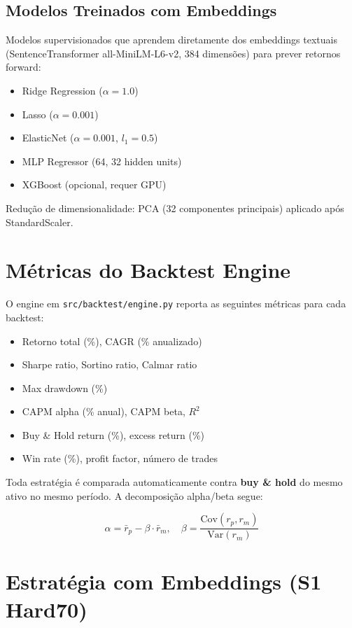 \documentclass[11pt, a4paper]{article}
\begin{document}
\subsection{Modelos Treinados com Embeddings}

Modelos supervisionados que aprendem diretamente dos embeddings textuais (SentenceTransformer all-MiniLM-L6-v2, 384 dimensões) para prever retornos forward:

\begin{itemize}
    \item Ridge Regression ($\alpha = 1.0$)
    \item Lasso ($\alpha = 0.001$)
    \item ElasticNet ($\alpha = 0.001$, $l_1 = 0.5$)
    \item MLP Regressor (64, 32 hidden units)
    \item XGBoost (opcional, requer GPU)
\end{itemize}

Redução de dimensionalidade: PCA (32 componentes principais) aplicado após StandardScaler.

\section{Métricas do Backtest Engine}

O engine em \texttt{src/backtest/engine.py} reporta as seguintes métricas para cada backtest:

\begin{itemize}
    \item Retorno total (\%), CAGR (\% anualizado)
    \item Sharpe ratio, Sortino ratio, Calmar ratio
    \item Max drawdown (\%)
    \item CAPM alpha (\% anual), CAPM beta, $R^2$
    \item Buy \& Hold return (\%), excess return (\%)
    \item Win rate (\%), profit factor, número de trades
\end{itemize}

Toda estratégia é comparada automaticamente contra \textbf{buy \& hold} do mesmo ativo no mesmo período. A decomposição alpha/beta segue:

\[
\alpha = \bar{r}_p - \beta \cdot \bar{r}_m, \quad
\beta = \frac{\text{Cov}(r_p, r_m)}{\text{Var}(r_m)}
\]

\section{Estratégia com Embeddings (S1 Hard70)}
\end{document}
